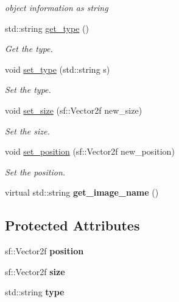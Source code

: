 \begin{DoxyCompactItemize}
\begin{DoxyCompactList}\small\item\em object information as string \end{DoxyCompactList}\item 
std\+::string \hyperlink{classdrawable_a329e564296d591dc8bd2f6dc5a205213}{get\+\_\+type} ()
\begin{DoxyCompactList}\small\item\em Get the type. \end{DoxyCompactList}\item 
void \hyperlink{classdrawable_aa019787b726542ca470fb817251e7b09}{set\+\_\+type} (std\+::string s)
\begin{DoxyCompactList}\small\item\em Set the type. \end{DoxyCompactList}\item 
void \hyperlink{classdrawable_a34b6b50f342c41f550f09e0465f95f61}{set\+\_\+size} (sf\+::\+Vector2f new\+\_\+size)
\begin{DoxyCompactList}\small\item\em Set the size. \end{DoxyCompactList}\item 
void \hyperlink{classdrawable_a5e40f2621daaca4ac32ef26b8c01b9a6}{set\+\_\+position} (sf\+::\+Vector2f new\+\_\+position)
\begin{DoxyCompactList}\small\item\em Set the position. \end{DoxyCompactList}\item 
\mbox{\label{classdrawable_a59285b12c068ce5e02def707f0b0ee3b}} 
virtual std\+::string {\bfseries get\+\_\+image\+\_\+name} ()
\end{DoxyCompactItemize}
\subsection*{Protected Attributes}
\begin{DoxyCompactItemize}
\item 
\mbox{\label{classdrawable_a34679fa5ae82eee65dfd6b1b9f3c7cb6}} 
sf\+::\+Vector2f {\bfseries position}
\item 
\mbox{\label{classdrawable_aa3900dd7b69b439a3514e6acdb4a17b9}} 
sf\+::\+Vector2f {\bfseries size}
\item 
\mbox{\label{classdrawable_ad5a982912d20a94b0e69de86cc9b53cb}} 
std\+::string {\bfseries type}
\end{DoxyCompactItemize}


